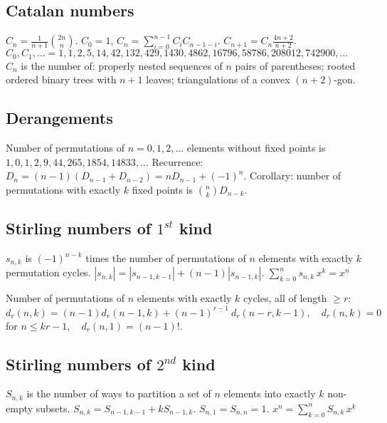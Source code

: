 \documentclass[12pt]{extarticle}
\begin{document}
\begin{multicols*}{2}
\subsection{Catalan numbers}
$C_n = \frac{1}{n+1} {2n \choose n}$.
\quad $C_0=1$, $C_n=\sum_{i=0}^{n-1} C_i C_{n-1-i}$.
\quad $C_{n+1} = C_n \frac{4n+2}{n+2}$. \\
$C_0, C_1, \ldots = 1, 1, 2, 5, 14, 42, 132, 429, 1430, 4862, 16796,
		58786, 208012, 742900, \ldots$ \\
$C_n$ is the number of:
properly nested sequences of $n$ pairs of parentheses;
rooted ordered binary trees with $n+1$ leaves;
triangulations of a convex $(n+2)$-gon.

\subsection{Derangements}
Number of permutations of $n=0,1,2,\dots$ elements without fixed points is
$1, 0, 1, 2, 9, 44, 265, 1854, 14833, \dots$
Recurrence: $D_n = (n-1)(D_{n-1} + D_{n-2}) = n D_{n-1} + (-1)^n$.
Corollary: number of permutations with exactly $k$ fixed points is ${n \choose k} D_{n-k}$.

\subsection{Stirling numbers of $1^{st}$ kind}
$s_{n,k}$ is $(-1)^{n-k}$ times the number of permutations of $n$ elements with
exactly $k$ permutation cycles.
$|s_{n,k}| = |s_{n-1,k-1}| + (n-1) |s_{n-1,k}|$. \quad
$\sum_{k=0}^n s_{n,k}\,x^k = x^{\underline n}$

Number of permutations of $n$ elements with exactly $k$ cycles,
all of length $\ge r$: \\
$d_r(n,k) = (n-1) d_r(n-1,k) + (n-1)^{\underline {r-1}}\ d_r(n-r,k-1),
\quad d_r(n,k)=0 $ for $ n\le kr-1, \quad d_r(n,1)=(n-1)!$.

\subsection{Stirling numbers of $2^{nd}$ kind}
$S_{n,k}$ is the number of ways to partition a set of $n$ elements into
exactly $k$ non-empty subsets.
$S_{n,k} = S_{n-1,k-1} + k S_{n-1,k}$.
$S_{n,1} = S_{n,n} = 1$.
$x^n = \sum_{k=0}^n S_{n,k}\,x^{\underline k}$



\end{multicols*}
\end{document}
